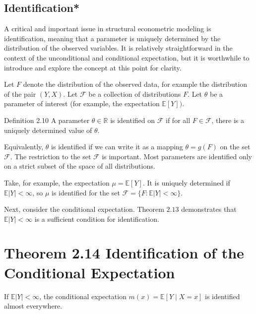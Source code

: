 \documentclass[10pt]{article}
\begin{document}
\subsection{Identification*}
A critical and important issue in structural econometric modeling is identification, meaning that a parameter is uniquely determined by the distribution of the observed variables. It is relatively straightforward in the context of the unconditional and conditional expectation, but it is worthwhile to introduce and explore the concept at this point for clarity.

Let $F$ denote the distribution of the observed data, for example the distribution of the pair $(Y, X)$. Let $\mathscr{F}$ be a collection of distributions $F$. Let $\theta$ be a parameter of interest (for example, the expectation $\mathbb{E}[Y])$.

Definition 2.10 A parameter $\theta \in \mathbb{R}$ is identified on $\mathscr{F}$ if for all $F \in \mathscr{F}$, there is a uniquely determined value of $\theta$.

Equivalently, $\theta$ is identified if we can write it as a mapping $\theta=g(F)$ on the set $\mathscr{F}$. The restriction to the set $\mathscr{F}$ is important. Most parameters are identified only on a strict subset of the space of all distributions.

Take, for example, the expectation $\mu=\mathbb{E}[Y]$. It is uniquely determined if $\mathbb{E}|Y|<\infty$, so $\mu$ is identified for the set $\mathscr{F}=\{F: \mathbb{E}|Y|<\infty\}$.

Next, consider the conditional expectation. Theorem $2.13$ demonstrates that $\mathbb{E}|Y|<\infty$ is a sufficient condition for identification.

\section{Theorem 2.14 Identification of the Conditional Expectation}
If $\mathbb{E}|Y|<\infty$, the conditional expectation $m(x)=\mathbb{E}[Y \mid X=x]$ is identified almost everywhere.
\end{document}
